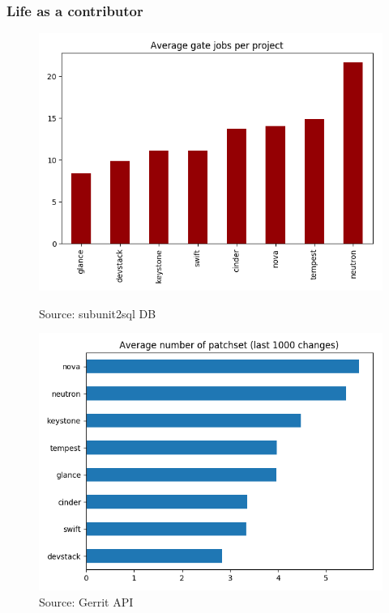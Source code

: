 \documentclass[aspectratio=169,11pt,hyperref={colorlinks=true}]{beamer}
\begin{document}
\begin{frame}
    \frametitle{Life as a contributor}
    \begin{figure}
        \begin{minipage}[b]{0.45\linewidth}
            \centering
    	   \includegraphics[width=1\textwidth]{jobs_per_change.png}
            \caption{Source: subunit2sql DB}
        \end{minipage}
        \hspace{0.5cm}
        \begin{minipage}[b]{0.45\linewidth}
            \centering
    	   \includegraphics[width=1\textwidth]{patchsets_per_change.png}
            \caption{Source: Gerrit API}
        \end{minipage}
    \end{figure}
\end{frame}
\end{document}
